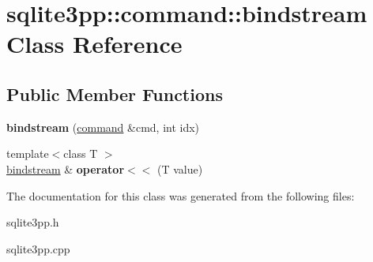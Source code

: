 \hypertarget{classsqlite3pp_1_1command_1_1bindstream}{\section{sqlite3pp\-:\-:command\-:\-:bindstream Class Reference}
\label{classsqlite3pp_1_1command_1_1bindstream}
}
\subsection*{Public Member Functions}
\begin{DoxyCompactItemize}
\item 
\hypertarget{classsqlite3pp_1_1command_1_1bindstream_ad57cb71ac6884312b455557633a25854}{{\bfseries bindstream} (\hyperlink{classsqlite3pp_1_1command}{command} \&cmd, int idx)}\label{classsqlite3pp_1_1command_1_1bindstream_ad57cb71ac6884312b455557633a25854}

\item 
\hypertarget{classsqlite3pp_1_1command_1_1bindstream_abaaf836396249baededca17a894e20ae}{{\footnotesize template$<$class T $>$ }\\\hyperlink{classsqlite3pp_1_1command_1_1bindstream}{bindstream} \& {\bfseries operator$<$$<$} (T value)}\label{classsqlite3pp_1_1command_1_1bindstream_abaaf836396249baededca17a894e20ae}

\end{DoxyCompactItemize}


The documentation for this class was generated from the following files\-:\begin{DoxyCompactItemize}
\item 
sqlite3pp.\-h\item 
sqlite3pp.\-cpp\end{DoxyCompactItemize}
